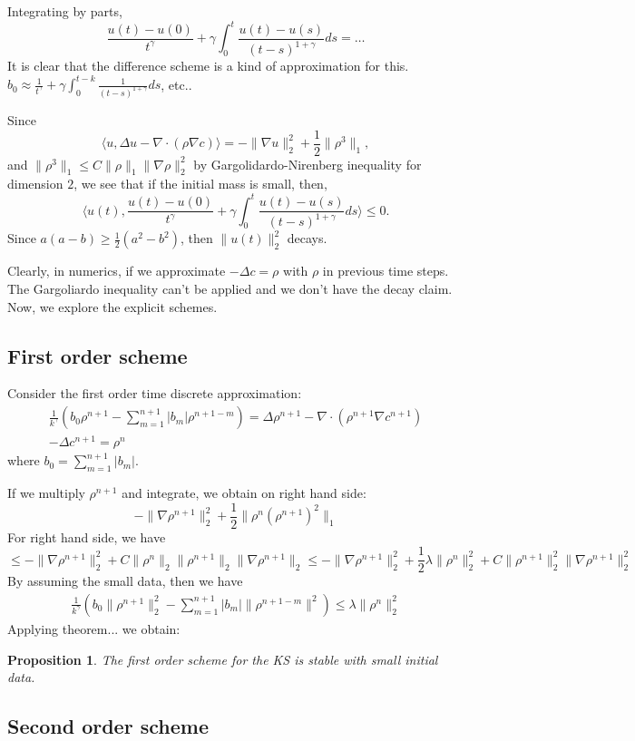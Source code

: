 \documentclass[11pt]{article}
\newtheorem{pro}{Proposition}
\begin{document}
Integrating by parts, $$
\frac{u(t)-u(0)}{t^{\gamma}}+\gamma\int_0^t\frac{u(t)-u(s)}{(t-s)^{1+\gamma}}ds
=\ldots
$$
It is clear that the difference scheme is a kind of approximation for this.
$b_0\approx \frac{1}{t^{\gamma}}+\gamma\int_0^{t-k}\frac{1}{(t-s)^{1+\gamma}}ds$, etc..

Since $$
\langle u, \Delta u-\nabla\cdot(\rho\nabla c)\rangle
=-\|\nabla u\|_2^2+\frac{1}{2}\|\rho^3\|_1,
$$
and $\|\rho^3\|_1\le C\|\rho\|_1\|\nabla\rho\|_2^2$ by Gargolidardo-Nirenberg inequality for dimension $2$, we see that if the initial mass is small, then, 
 $$
\langle u(t), \frac{u(t)-u(0)}{t^{\gamma}}+\gamma\int_0^t\frac{u(t)-u(s)}{(t-s)^{1+\gamma}}ds\rangle\le 0. 
$$
Since $a(a-b)\ge \frac{1}{2}(a^2-b^2)$, then $\|u(t)\|_2^2$ decays.

Clearly, in numerics, if we approximate $-\Delta c=\rho$ with $\rho$ in previous time steps. The Gargoliardo inequality can't be applied and we don't have the decay claim. Now, we explore the explicit schemes.

\subsection{First order scheme}

Consider the first order time discrete approximation: 
\begin{gather}
\frac{1}{k^{\gamma}}(b_0\rho^{n+1}-\sum_{m=1}^{n+1}|b_m|\rho^{n+1-m})=\Delta\rho^{n+1}-\nabla\cdot(\rho^{n+1}\nabla c^{n+1})\\
-\Delta c^{n+1}=\rho^n
\end{gather}
where $b_0=\sum_{m=1}^{n+1}|b_m|$.

If we multiply $\rho^{n+1}$ and integrate, we obtain on right hand side: $$
-\|\nabla\rho^{n+1}\|_2^2+\frac{1}{2}\|\rho^n(\rho^{n+1})^2\|_1
$$ 
For right hand side, we have $$
\le -\|\nabla\rho^{n+1}\|_2^2+C\|\rho^n\|_2\|\rho^{n+1}\|_2\|\nabla\rho^{n+1}\|_2
\le -\|\nabla\rho^{n+1}\|_2^2+\frac{1}{2}\lambda\|\rho^n\|_2^2+C\|\rho^{n+1}\|_2^2\|\nabla\rho^{n+1}\|_2^2
$$
By assuming the small data, then we have 
\begin{gather*}
\frac{1}{k^{\gamma}}(b_0\|\rho^{n+1}\|_2^2-\sum_{m=1}^{n+1}|b_m|\|\rho^{n+1-m}\|^2)
\le \lambda \|\rho^n\|_2^2
\end{gather*}
Applying theorem... we obtain:
\begin{pro}
The first order scheme for the KS is stable with small initial data.
\end{pro}


\subsection{Second order scheme}
\end{document}
